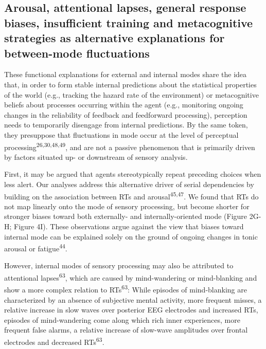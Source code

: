 \documentclass[
]{article}
\begin{document}
\hypertarget{arousal-attentional-lapses-general-response-biases-insufficient-training-and-metacognitive-strategies-as-alternative-explanations-for-between-mode-fluctuations}{%
\subsection{Arousal, attentional lapses, general response biases,
insufficient training and metacognitive strategies as alternative
explanations for between-mode
fluctuations}\label{arousal-attentional-lapses-general-response-biases-insufficient-training-and-metacognitive-strategies-as-alternative-explanations-for-between-mode-fluctuations}}

These functional explanations for external and internal modes share the
idea that, in order to form stable internal predictions about the
statistical properties of the world (e.g., tracking the hazard rate of
the environment) or metacognitive beliefs about processes occurring
within the agent (e.g., monitoring ongoing changes in the reliability of
feedback and feedforward processing), perception needs to temporarily
disengage from internal predictions. By the same token, they presuppose
that fluctuations in mode occur at the level of perceptual
processing\textsuperscript{26,30,48,49}, and are not a passive
phenomenon that is primarily driven by factors situated up- or
downstream of sensory analysis.

First, it may be argued that agents stereotypically repeat preceding
choices when less alert. Our analyses address this alternative driver of
serial dependencies by building on the association between RTs and
arousal\textsuperscript{45,47}. We found that RTs do not map linearly
onto the mode of sensory processing, but become shorter for stronger
biases toward both externally- and internally-oriented mode (Figure
2G-H; Figure 4I). These observations argue against the view that biases
toward internal mode can be explained solely on the ground of ongoing
changes in tonic arousal or fatigue\textsuperscript{44}.

However, internal modes of sensory processing may also be attributed to
attentional lapses\textsuperscript{63}, which are caused by
mind-wandering or mind-blanking and show a more complex relation to
RTs\textsuperscript{63}: While episodes of mind-blanking are
characterized by an absence of subjective mental activity, more frequent
misses, a relative increase in slow waves over posterior EEG electrodes
and increased RTs, episodes of mind-wandering come along which rich
inner experiences, more frequent false alarms, a relative increase of
slow-wave amplitudes over frontal electrodes and decreased
RTs\textsuperscript{63}.
\end{document}
